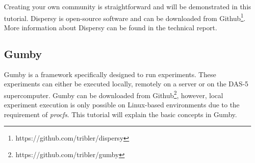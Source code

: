 \documentclass{article}
\begin{document}
Creating your own community is straightforward and will be demonstrated in this tutorial.
Dispersy is open-source software and can be downloaded from Github\footnote{https://github.com/tribler/dispersy}.
More information about Dispersy can be found in the technical report\cite{zeilemaker2013dispersy}.

\subsection{Gumby}
Gumby is a framework specifically designed to run experiments.
These experiments can either be executed locally, remotely on a server or on the DAS-5 supercomputer.
Gumby can be downloaded from Github\footnote{https://github.com/tribler/gumby}, however, local experiment execution is only possible on Linux-based environments due to the requirement of \emph{procfs}.
This tutorial will explain the basic concepts in Gumby.


{\small }
\end{document}
